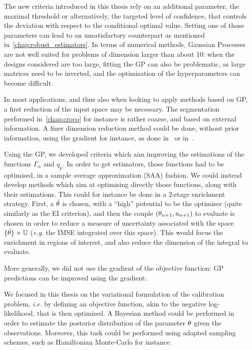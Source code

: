 \documentclass[../../Main_ManuscritThese.tex]{subfiles}
\begin{document}
The new criteria introduced in this thesis rely on an additional
parameter, the maximal threshold or alternatively, the targeted level
of confidence, that controls the deviation with respect to the
conditional optimal value. Setting one of those parameters can lead to
an unsatisfactory counterpart as mentioned
in~\cref{chap:robust_estimators}. In terms of numerical methods,
Gaussian Processes are not well suited for problems of dimension
larger than about \num{10}: when the designs considered are too large,
fitting the GP can also be problematic, as large matrices need to be
inverted, and the optimisation of the hyperparameters can become difficult.

In most applications, and thus also when looking to apply methods
based on GP, a first reduction of the input space may be
necessary. The segmentation performed in~\cref{chap:croco} for instance is
rather coarse, and based on external information. A finer dimension
reduction method could be done, without prior information, using the
gradient for instance, as done in~\cite{benameur_refinement_2002} or
in~\cite{zahm_certified_2018}.

Using the GP, we developed criteria which aim improving the
estimations of the functions $\Gamma_\alpha$ and $q_p$. In order to
get estimators, those functions had to be optimised, in a sample
average approximation (SAA) fashion. We could instead develop methods
which aim at optimising directly those functions, along with their
estimations. This could for instance be done in a $2$-stage enrichment
strategy. First, a $\tilde{\theta}$ is chosen, with a ``high'' potential to be
the optimiser (quite similarly as the EI criterion), and then the
couple $(\theta_{n+1}, u_{n+1})$ to evaluate is chosen in order to
reduce a measure of uncertainty associated with the space
$\{\tilde{\theta}\} \times \mathbb{U}$ (\emph{e.g.} the IMSE integrated over this
space). This would focus the enrichment in regions of interest, and
also reduce the dimension of the integral to evaluate.


More generally, we did not use the gradient of the objective function:
GP predictions can be improved using the gradient:
\cite{bouhlel_gradient-enhanced_2019,laurent_overview_2019}


We focused in this thesis on the variational
formulation of the calibration problem, \emph{i.e.} by defining an
objective function, akin to the negative log-likelihood, that is then
optimised. A Bayesian method could be performed in order to estimate
the posterior distribution of the parameter $\theta$ given the
observations. Moreover, this task could be performed using adapted
sampling schemes, such as Hamiltonian Monte-Carlo
\cite{betancourt_conceptual_2017} for instance.
\end{document}
